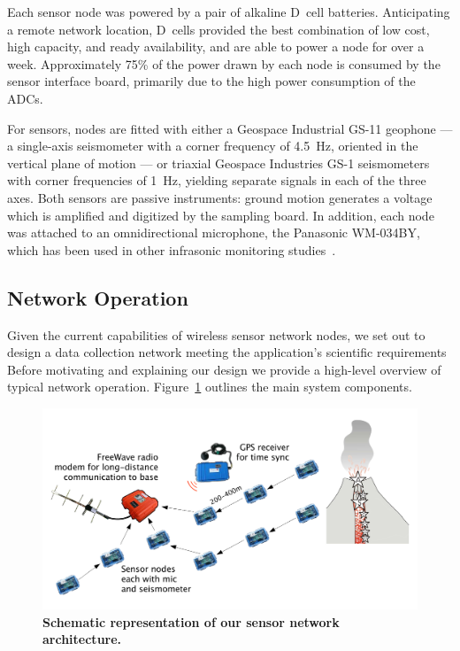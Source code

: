 Each sensor node was powered by a pair of alkaline D~cell batteries.
Anticipating a remote network location, D~cells provided the best combination
of low cost, high capacity, and ready availability, and are able to power a
node for over a week. Approximately 75\% of the power drawn by each node is
consumed by the sensor interface board, primarily due to the high power
consumption of the ADCs.

For sensors, nodes are fitted with either a Geospace Industrial GS-11
geophone --- a single-axis seismometer with a corner frequency of 4.5~Hz,
oriented in the vertical plane of motion --- or triaxial Geospace Industries
GS-1 seismometers with corner frequencies of 1~Hz, yielding separate signals
in each of the three axes. Both sensors are passive instruments: ground
motion generates a voltage which is amplified and digitized by the sampling
board. In addition, each node was attached to an omnidirectional microphone,
the Panasonic WM-034BY, which has been used in other infrasonic monitoring
studies~\cite{johnson-etal-04b}.

\subsection{Network Operation}

Given the current capabilities of wireless sensor network nodes, we set out
to design a data collection network meeting the application's scientific
requirements Before motivating and explaining our design we provide a
high-level overview of typical network operation.
Figure~\ref{evaluation-fig-architecture} outlines the main system components.

\begin{figure}[t!]
\begin{center}
\includegraphics[width=0.7\hsize]{./3-evaluation/figs/architecture.pdf}
\end{center}
\caption{\textbf{Schematic representation of our sensor network
architecture.}}
\label{evaluation-fig-architecture}
\end{figure}

